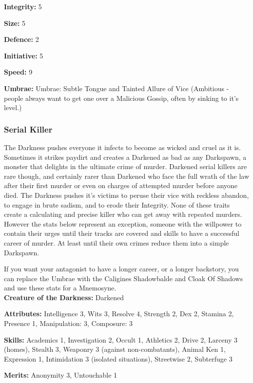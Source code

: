 \noindent \textbf{Integrity:} 5

\noindent \textbf{Size:} 5

\noindent \textbf{Defence:} 2

\noindent \textbf{Initiative:} 5

\noindent \textbf{Speed:} 9

\noindent \textbf{Umbrae:} Umbrae: Subtle Tongue and Tainted Allure of Vice (Ambitious - people always want to get one over a Malicious Gossip, often by sinking to it's level.) 

\subsubsection*{Serial Killer}

The Darkness pushes everyone it infects to become as wicked and cruel as it is. Sometimes it strikes paydirt and creates a Darkened as bad as any Darkspawn, a monster that delights in the ultimate crime of murder. Darkened serial killers are rare though, and certainly rarer than Darkened who face the full wrath of the law after their first murder or even on charges of attempted murder before anyone died. The Darkness pushes it's victims to peruse their vice with reckless abandon, to engage in brute sadism, and to erode their Integrity. None of these traits create a calculating and precise killer who can get away with repeated murders. However the stats below represent an exception, someone with the willpower to contain their urges until their tracks are covered and skills to have a successful career of murder. At least until their own crimes reduce them into a simple Darkspawn.

If you want your antagonist to have a longer career, or a longer backstory, you can replace the Umbrae with the Caligines Shadowbalde and Cloak Of Shadows and use these stats for a Mnemosyne. \\

\noindent \textbf{Creature of the Darkness:} Darkened

\noindent \textbf{Attributes:} Intelligence 3, Wits 3, Resolve 4, Strength 2, Dex 2, Stamina 2, Presence 1, Manipulation: 3, Composure: 3

\noindent \textbf{Skills:} Academics 1, Investigation 2, Occult 1, Athletics 2, Drive 2, Larceny 3 (homes), Stealth 3, Weaponry 3 (against non-combatants), Animal Ken 1, Expression 1, Intimidation 3 (isolated situations), Streetwise 2, Subterfuge 3

\noindent \textbf{Merits:} Anonymity 3, Untouchable 1

